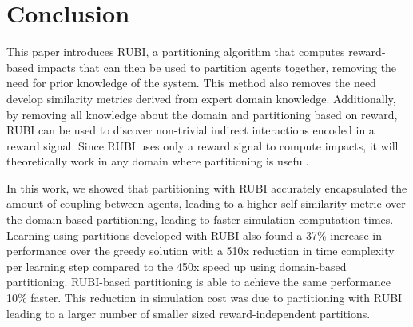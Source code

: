 \documentclass[letterpaper]{article}
\begin{document}



\section{Conclusion}
This paper introduces RUBI, a partitioning algorithm that computes reward-based impacts that can then be used to partition agents together, removing the need for prior knowledge of the system. This method also removes the need develop similarity metrics derived from expert domain knowledge. Additionally, by removing all knowledge about the domain and partitioning based on reward, RUBI can be used to discover non-trivial indirect interactions encoded in a reward signal. Since RUBI uses only a reward signal to compute impacts, it will theoretically work in any domain where partitioning is useful.

In this work, we showed that partitioning with RUBI accurately encapsulated the amount of coupling between agents, leading to a higher self-similarity metric over the domain-based partitioning, leading to faster simulation computation times. Learning using partitions developed with RUBI also found a 37\% increase in performance over the greedy solution with a 510x reduction in time complexity per learning step  compared to the 450x speed up using domain-based partitioning. RUBI-based partitioning is able to achieve the same performance 10\% faster. This reduction in simulation cost was due to partitioning with RUBI leading to a larger number of smaller sized reward-independent partitions.
\end{document}
